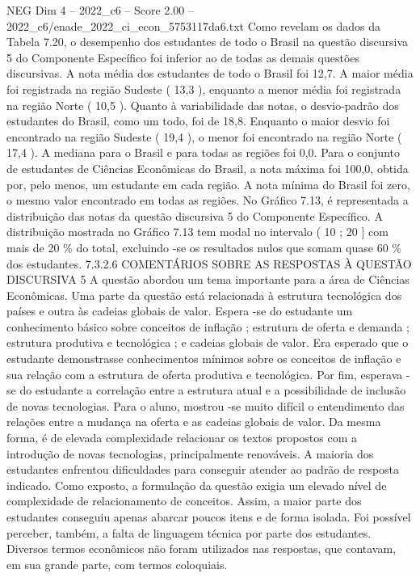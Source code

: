 \begin{textsample}{NEG Dim 4 – 2022\_c6 – Score 2.00 – 2022\_c6/enade\_2022\_ci\_econ\_5753117da6.txt}
Como revelam os dados da Tabela 7.20, o desempenho dos estudantes de todo o Brasil na questão discursiva 5 do Componente Específico foi inferior ao de todas as demais questões discursivas.
A nota média dos estudantes de todo o Brasil foi 12,7.
A maior média foi registrada na região Sudeste ( 13,3 ), enquanto a menor média foi registrada na região Norte ( 10,5 ).
Quanto à variabilidade das notas, o desvio-padrão dos estudantes do Brasil, como um todo, foi de 18,8.
Enquanto o maior desvio foi encontrado na região Sudeste ( 19,4 ), o menor foi encontrado na região Norte ( 17,4 ).
A mediana para o Brasil e para todas as regiões foi 0,0.
Para o conjunto de estudantes de Ciências Econômicas do Brasil, a nota máxima foi 100,0, obtida por, pelo menos, um estudante em cada região.
A nota mínima do Brasil foi zero, o mesmo valor encontrado em todas as regiões.
No Gráfico 7.13, é representada a distribuição das notas da questão discursiva 5 do Componente Específico.
A distribuição mostrada no Gráfico 7.13 tem modal no intervalo ( 10 ; 20 ] com mais de 20 \% do total, excluindo -se os resultados nulos que somam quase 60 \% dos estudantes. 7.3.2.6 COMENTÁRIOS SOBRE AS RESPOSTAS À QUESTÃO DISCURSIVA 5 A questão abordou um tema importante para a área de Ciências Econômicas.
Uma parte da questão está relacionada à estrutura tecnológica dos países e outra às cadeias globais de valor.
Espera -se do estudante um conhecimento básico sobre conceitos de inflação ; estrutura de oferta e demanda ; estrutura produtiva e tecnológica ; e cadeias globais de valor.
Era esperado que o estudante demonstrasse conhecimentos mínimos sobre os conceitos de inflação e sua relação com a estrutura de oferta produtiva e tecnológica.
Por fim, esperava -se do estudante a correlação entre a estrutura atual e a possibilidade de inclusão de novas tecnologias.
Para o aluno, mostrou -se muito difícil o entendimento das relações entre a mudança na oferta e as cadeias globais de valor.
Da mesma forma, é de elevada complexidade relacionar os textos propostos com a introdução de novas tecnologias, principalmente renováveis.
A maioria dos estudantes enfrentou dificuldades para conseguir atender ao padrão de resposta indicado.
Como exposto, a formulação da questão exigia um elevado nível de complexidade de relacionamento de conceitos.
Assim, a maior parte dos estudantes conseguiu apenas abarcar poucos itens e de forma isolada.
Foi possível perceber, também, a falta de linguagem técnica por parte dos estudantes.
Diversos termos econômicos não foram utilizados nas respostas, que contavam, em sua grande parte, com termos coloquiais.

\end{textsample}
